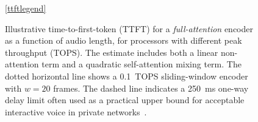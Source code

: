 \begin{figure}[t]
  \vspace{-0.3em}
  \ref{ttftlegend}

  \caption{Illustrative time-to-first-token (TTFT) for a \emph{full-attention}
  encoder as a function of audio length, for processors with different peak
  throughput (TOPS). The estimate includes both a linear non-attention term and
  a quadratic self-attention mixing term. The dotted horizontal line shows a 0.1~TOPS 
  sliding-window encoder with $w=20$ frames.
  The dashed line indicates a 250~ms one-way delay limit often used as a
  practical upper bound for acceptable interactive voice in private
  networks~\citep{cisco_delay_details}.}
  \label{fig:ttft_full_attention}
\end{figure}
